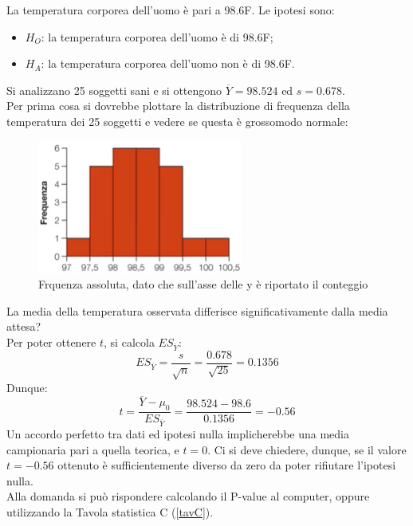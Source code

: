\documentclass[10pt, draft]{book}
\newcommand{\tightlist}{%
\setlength{\itemsep}{1pt}\setlength{\parskip}{0pt}\setlength{\parsep}{0pt}}
\newcounter{example}[section]
\begin{document}
\begin{example}
    La temperatura corporea dell'uomo è pari a 98.6\textdegree F.
    Le ipotesi sono:
    \begin{itemize} \tightlist
        \item $H_O$: la temperatura corporea dell'uomo è di 98.6\textdegree F;
        \item $H_A$: la temperatura corporea dell'uomo non è di 98.6\textdegree F.
    \end{itemize}
    Si analizzano 25 soggetti sani e si ottengono $\overline{Y} = 98.524$ ed $s = 0.678$.
    \\
    Per prima cosa si dovrebbe plottare la distribuzione di frequenza della temperatura dei 25 soggetti e vedere se questa è grossomodo normale:
    \begin{figure}[H]\label{fig11.3-1}
        \centering
        \includegraphics[width=0.6\textwidth]{fig11.3-1}
        \caption{\small{Frquenza assoluta, dato che sull'asse delle y è riportato il conteggio}}
    \end{figure}
    La media della temperatura osservata differisce significativamente dalla media attesa?
    \\
    Per poter ottenere $t$, si calcola $ES_{\overline{Y}}$:
    \begin{equation}
        ES_{\overline{Y}} = \frac{s}{\sqrt{n}} = \frac{0.678}{\sqrt{25}} = 0.1356
    \end{equation}
    Dunque:
    \begin{equation}
        t = \frac{\overline{Y}-\mu_0}{ES_{\overline{Y}}} = \frac{98.524-98.6}{0.1356} = -0.56
    \end{equation}
    Un accordo perfetto tra dati ed ipotesi nulla implicherebbe una media campionaria pari a quella teorica, e $t=0$. Ci si deve chiedere, dunque, se il valore $t=-0.56$ ottenuto è sufficientemente diverso da zero da poter rifiutare l'ipotesi nulla.
    \\
    Alla domanda si può rispondere calcolando il P-value al computer, oppure utilizzando la Tavola statistica C (\ref{tavC}).

\end{example}
\end{document}
